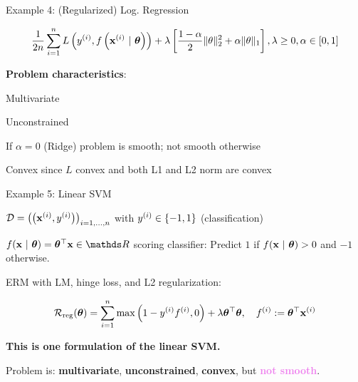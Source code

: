 \documentclass[11pt,compress,t,notes=noshow, xcolor=table]{beamer}
\begin{document}
\begin{framei}{Example 4: (Regularized) Log. Regression}
\item[] $$ \frac{1}{2n} \sum\limits_{i=1}^n L\left(y^{(i)}, f\left(\mathbf{x}^{(i)} ~|~ \bm{\theta}\right)\right) + \lambda \left[\frac{1-\alpha}{2}\|\theta\|^{2}_{2} + \alpha\|\theta\|_{1}\right], \lambda \geq 0, \alpha \in [0,1] $$
\item \textbf{Problem characteristics}:
  \begin{itemizeL}
  \item Multivariate
  \item Unconstrained
  \item If $\alpha = 0$ (Ridge) problem is smooth; not smooth otherwise
  \item Convex since $L$ convex and both L1 and L2 norm are convex
  \end{itemizeL}
\end{framei}

\begin{framei}{Example 5: Linear SVM}
\item $\mathcal{D} = \left(\left(\mathbf{x}^{(i)}, y^{(i)}\right)\right)_{i = 1, ..., n}$ with $y^{(i)} \in \{-1, 1\}$ (classification)
\item $\fxt = \thetav^\top \xv \in \R$ scoring classifier: Predict $1$ if $f(\mathbf{x} ~|~ \bm{\theta}) > 0$ and $-1$ otherwise.
\item ERM with LM, hinge loss, and L2 regularization:
\item[] $$ \mathcal{R}_{\text{reg}}(\bm{\theta}) = \sum\limits_{i=1}^n \max\left(1 - y^{(i)} f^{(i)}, 0\right) + \lambda \bm{\theta}^\top \bm{\theta}, \quad f^{(i)} := \bm{\theta}^\top \mathbf{x}^{(i)} $$
\vfill
\splitVThree
{
}
{
}
{
\begin{itemizeM}[small]
\item \textbf{This is one formulation of the linear SVM.}
\item Problem is: \textbf{multivariate}, \textbf{unconstrained}, \textbf{convex}, but \textcolor{violet}{\textbf{not smooth}}.
\end{itemizeM}
}
\end{framei}
\end{document}
